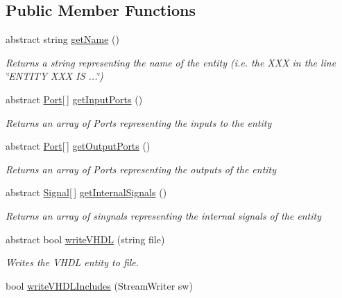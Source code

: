 \subsection*{Public Member Functions}
\begin{DoxyCompactItemize}
\item 
abstract string \hyperlink{class_n_n_gen_1_1_entity_a9f25d1070c9ab8ad343c28443e62e6f2}{get\+Name} ()
\begin{DoxyCompactList}\small\item\em Returns a string representing the name of the entity (i.\+e. the X\+X\+X in the line \char`\"{}\+E\+N\+T\+I\+T\+Y X\+X\+X I\+S ...\char`\"{}) \end{DoxyCompactList}\item 
abstract \hyperlink{class_n_n_gen_1_1_port}{Port}\mbox{[}$\,$\mbox{]} \hyperlink{class_n_n_gen_1_1_entity_a01239f05c9efa61ec9e6a29cb2eaad50}{get\+Input\+Ports} ()
\begin{DoxyCompactList}\small\item\em Returns an array of Ports representing the inputs to the entity \end{DoxyCompactList}\item 
abstract \hyperlink{class_n_n_gen_1_1_port}{Port}\mbox{[}$\,$\mbox{]} \hyperlink{class_n_n_gen_1_1_entity_ace06368087778e254a5048c7d28747be}{get\+Output\+Ports} ()
\begin{DoxyCompactList}\small\item\em Returns an array of Ports representing the outputs of the entity \end{DoxyCompactList}\item 
abstract \hyperlink{class_n_n_gen_1_1_signal}{Signal}\mbox{[}$\,$\mbox{]} \hyperlink{class_n_n_gen_1_1_entity_a62feb80e95ec84c650ea17bd53f0d510}{get\+Internal\+Signals} ()
\begin{DoxyCompactList}\small\item\em Returns an array of singnals representing the internal signals of the entity \end{DoxyCompactList}\item 
abstract bool \hyperlink{class_n_n_gen_1_1_entity_a1111d498446be08b20583b9625893a52}{write\+V\+H\+D\+L} (string file)
\begin{DoxyCompactList}\small\item\em Writes the V\+H\+D\+L entity to file. \end{DoxyCompactList}\item 
bool \hyperlink{class_n_n_gen_1_1_entity_a75a568e4f2375bb409c5f31e17bf2585}{write\+V\+H\+D\+L\+Includes} (Stream\+Writer sw)

\end{DoxyCompactItemize}
